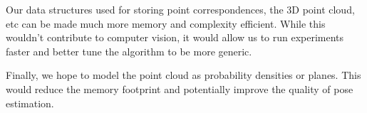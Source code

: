 \documentclass{article}
\begin{document}
Our data structures used for storing point correspondences, the 3D point cloud, etc can be made much more memory and complexity efficient. While this wouldn't contribute to computer vision, it would allow us to run experiments faster and better tune the algorithm to be more generic.

Finally, we hope to model the point cloud as probability densities or planes. This would reduce the memory footprint and potentially improve the quality of pose estimation.




\begin{comment}
\begin{thebibliography}{15}

\bibitem{Szeliski}
Szeliski, Richard. \textit{Computer Vision: Algorithms and Applications}. 1st ed. London: Springer-Verlag, 2010. Print.

\bibitem{middlebury} Temple dataset \url{http://vision.middlebury.edu/mview/data/}

      \bibitem{akaze} P. Alcantarilla, J. Nuevo and A. Bartoli, \textit{Fast Explicit Diffusion for Accelerated Features in Nonlinear Scale Spaces}, BMVC 2013
      \bibitem{threepoint} F. Fraundorfer, P. Tanskanen and M. Pollefeys \textit{A minimal case solution to the calibrated relative pose problem for the case of two known orientation angles}, ECCV 2010.
       \bibitem{vo} D. Nister, O. Naroditsky and J. Bergen \textit{Visual Odometry}, CVPR 2004
       
       \bibitem{homography} O. D. Faugeras and F. Lustman, \textit{Motion and structure from motion in a piecewise planar environment}, IJPRAI, 1988

       \bibitem{semidense} T. Schops, J. Engel and D. Cremers \textit{Semi-Dense visual odometry for AR on a smartphone}
      \bibitem{tumsensor} P. Tiefenbacher, T. Schulze and G. Rigoll \textit{Off-the-shelf sensor integration for mono-SLAM on Smart Devices}, CVPR 2015
      \end{thebibliography}
\end{comment}

\end{document}
